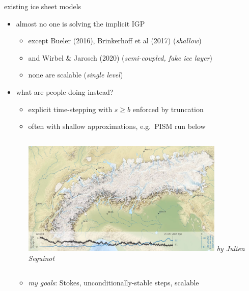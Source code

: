 \documentclass[usepdftitle=false]{beamer}
\begin{document}
\begin{frame}{existing ice sheet models}

\begin{itemize}
\item almost no one is solving the implicit IGP
    \begin{itemize}
    \item except Bueler (2016), Brinkerhoff et al (2017) (\emph{shallow})
    \item and Wirbel \& Jarosch (2020) (\emph{semi-coupled, fake ice layer})
    \item none are scalable (\emph{single level})
    \end{itemize}
\item what are people doing instead?
    \begin{itemize}
    \item \alert{explicit time-stepping with $s \ge b$ enforced by truncation}
    \item often with shallow approximations, e.g.~PISM run below

\medskip
\begin{columns}
        \includegraphics[width=0.8\textwidth]{figs/seguinot.png}
        \scriptsize \emph{by Julien Seguinot}
\end{columns}

\medskip
    \item \emph{my goals}: Stokes, unconditionally-stable steps, scalable
    \end{itemize}
\end{itemize}
\end{frame}
\end{document}
